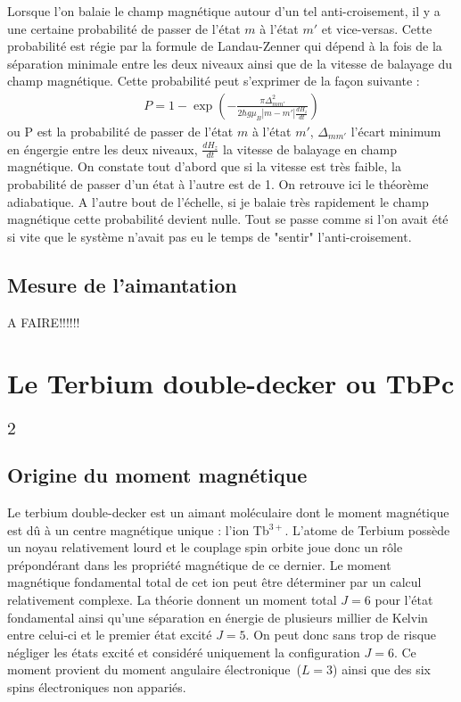 Lorsque l'on balaie le champ magnétique autour d'un tel anti-croisement, il y a une certaine probabilité de passer de l'état $m$ à l'état $m'$ et vice-versas. Cette probabilité est régie par la formule de Landau-Zenner qui dépend à la fois de la séparation minimale entre les deux niveaux ainsi que de la vitesse de balayage du champ magnétique. Cette probabilité peut s'exprimer de la façon suivante :
\begin{eqnarray}
P = 1 - \exp \left( -\frac{\pi \Delta^2_{mm'}}{2 \hbar g \mu_B |m-m'|\frac{dH_z}{dt}} \right)
\end{eqnarray}
ou P est la probabilité de passer de l'état $m$ à l'état $m'$, $\Delta_{mm'}$ l'écart minimum en éngergie entre les deux niveaux, $\frac{dH_z}{dt}$ la vitesse de balayage en champ magnétique. On constate tout d'abord que si la vitesse est très faible, la probabilité de passer d'un état à l'autre est de 1. On retrouve ici le théorème adiabatique. A l'autre bout de l'échelle, si je balaie très rapidement le champ magnétique cette probabilité devient nulle. Tout se passe comme si l'on avait été si vite que le système n'avait pas eu le temps de "sentir" l'anti-croisement.

\subsection{Mesure de l'aimantation}

A FAIRE!!!!!!

\section{Le Terbium double-decker ou TbPc$_2$}

\subsection{Origine du moment magnétique}
Le terbium double-decker est un aimant moléculaire dont le moment magnétique est d\^u à un centre magnétique unique : l'ion Tb$^{3+}$. L'atome de Terbium possède un noyau relativement lourd et le couplage spin orbite joue donc un r\^ole prépondérant dans les propriété magnétique de ce dernier. Le moment magnétique fondamental total de cet ion peut \^etre déterminer par un calcul relativement complexe. La théorie donnent un moment total $J=6$ pour l'état fondamental ainsi qu'une séparation en énergie de plusieurs millier de Kelvin entre celui-ci et le premier état excité $J=5$. On peut donc sans trop de risque négliger les états excité et considéré uniquement la configuration $J=6$. Ce moment provient du moment angulaire électronique~($L=3$) ainsi que des six spins électroniques non appariés. 

